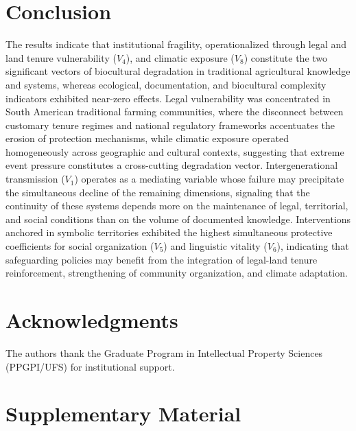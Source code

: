 \documentclass[12pt,a4paper]{article}
\begin{document}
\section{Conclusion}
\label{sec:conclusions}

The results indicate that institutional fragility, operationalized through legal and land tenure vulnerability ($V_4$), and climatic exposure ($V_8$) constitute the two significant vectors of biocultural degradation in traditional agricultural knowledge and systems, whereas ecological, documentation, and biocultural complexity indicators exhibited near-zero effects. Legal vulnerability was concentrated in South American traditional farming communities, where the disconnect between customary tenure regimes and national regulatory frameworks accentuates the erosion of protection mechanisms, while climatic exposure operated homogeneously across geographic and cultural contexts, suggesting that extreme event pressure constitutes a cross-cutting degradation vector. Intergenerational transmission ($V_1$) operates as a mediating variable whose failure may precipitate the simultaneous decline of the remaining dimensions, signaling that the continuity of these systems depends more on the maintenance of legal, territorial, and social conditions than on the volume of documented knowledge. Interventions anchored in symbolic territories exhibited the highest simultaneous protective coefficients for social organization ($V_5$) and linguistic vitality ($V_6$), indicating that safeguarding policies may benefit from the integration of legal-land tenure reinforcement, strengthening of community organization, and climate adaptation.

\section*{Acknowledgments}

The authors thank the Graduate Program in Intellectual Property Sciences (PPGPI/UFS) for institutional support.


\section*{Supplementary Material}
\end{document}
